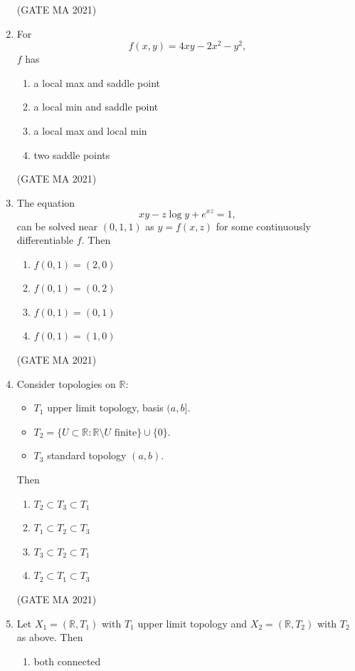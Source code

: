 \documentclass[journal,12pt,onecolumn]{IEEEtran}
\theoremstyle{remark}
\begin{document}
\begin{enumerate}
\begin{enumerate}
    \end{enumerate}
\hfill(GATE MA 2021)
    \item For
    $$
    f(x,y) = 4xy - 2x^2 - y^2,
    $$
    $f$ has
    \begin{enumerate}
        \item a local max and saddle point
        \item a local min and saddle point
        \item a local max and local min
        \item two saddle points
    \end{enumerate}
\hfill(GATE MA 2021)
    \item The equation
    $$
    xy - z \log y + e^{xz} = 1,
    $$
    can be solved near $(0,1,1)$ as $y = f(x,z)$ for some continuously differentiable $f$. Then
    \begin{enumerate}
        \item $f(0,1) = (2,0)$
        \item $f(0,1) = (0,2)$
        \item $f(0,1) = (0,1)$
        \item $f(0,1) = (1,0)$
    \end{enumerate}
\hfill(GATE MA 2021)
    \item Consider topologies on $\mathbb{R}$:
    \begin{itemize}
        \item $T_1$ upper limit topology, basis $(a,b]$.
        \item $T_2 = \{ U \subset \mathbb{R} : \mathbb{R}\setminus U \text{ finite} \} \cup \{0\}$.
        \item $T_3$ standard topology $(a,b)$.
    \end{itemize}
    Then
    \begin{enumerate}
        \item $T_2 \subset T_3 \subset T_1$
        \item $T_1 \subset T_2 \subset T_3$
        \item $T_3 \subset T_2 \subset T_1$
        \item $T_2 \subset T_1 \subset T_3$
    \end{enumerate}
\hfill(GATE MA 2021)
    \item Let $X_1=(\mathbb{R},T_1)$ with $T_1$ upper limit topology and $X_2 = (\mathbb{R},T_2)$ with $T_2$ as above. Then
    \begin{enumerate}
        \item both connected

\end{enumerate}
\end{enumerate}
\end{document}
